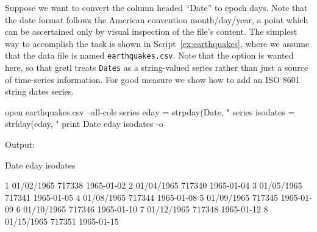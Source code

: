 \begin{center}
\end{center}

Suppose we want to convert the column headed ``Date'' to epoch
days. Note that the date format follows the American convention
month/day/year, a point which can be ascertained only by visual
inspection of the file's content. The simplest way to accomplish the
task is shown in Script~\ref{ex:earthquakes}, where we assume that the
data file is named \texttt{earthquakes.csv}. Note that the
 option is wanted here, so that gretl treats
\texttt{Dates} as a string-valued series rather than just a source of
time-series information. For good measure we show how to add an ISO
8601 string dates series.

\begin{script}[htbp]
  \label{ex:earthquakes}
\begin{scodebit}
open earthquakes.csv --all-cols
series eday = strpday(Date, "%
series isodates = strfday(eday, "%
print Date eday isodates -o
\end{scodebit}
  
Output:
\begin{outbit}
          Date         eday     isodates

1   01/02/1965       717338   1965-01-02
2   01/04/1965       717340   1965-01-04
3   01/05/1965       717341   1965-01-05
4   01/08/1965       717344   1965-01-08
5   01/09/1965       717345   1965-01-09
6   01/10/1965       717346   1965-01-10
7   01/12/1965       717348   1965-01-12
8   01/15/1965       717351   1965-01-15
\end{outbit}
\end{script}

